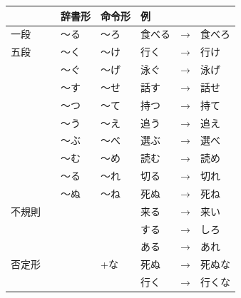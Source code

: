 	\noindent
	\begin{table}[h]
	\centering
	\begin{tabular}{llllll}
		\toprule[2pt]
		& 辞書形 & 命令形 & 例 & & \\
		\midrule
		一段 & 〜る & 〜ろ & 食べる&→&食べろ\\
		\midrule
		五段 & 〜く & 〜け & 行く&→&行け\\
		& 〜ぐ & 〜げ & 泳ぐ&→&泳げ\\
		& 〜す & 〜せ & 話す&→&話せ\\
		& 〜つ & 〜て & 持つ&→&持て\\
		& 〜う & 〜え & 追う&→&追え\\
		& 〜ぶ & 〜べ & 選ぶ&→&選べ\\
		& 〜む & 〜め & 読む&→&読め\\
		& 〜る & 〜れ & 切る&→&切れ\\
		& 〜ぬ & 〜ね & 死ぬ&→&死ね\\
		\midrule
		不規則	& & & 来る &→& 来い \\
		& & & する &→& しろ \\
		& & & ある &→& あれ \\
		\midrule
		否定形　& &+な & 死ぬ &→&死ぬな\\
		& & & 行く &→& 行くな \\
		\bottomrule[2pt]
	\end{tabular}
	\end{table}


